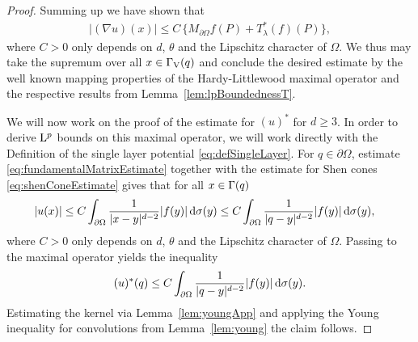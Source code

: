 \begin{proof}
  Summing up we have shown that
  \begin{align*}
    |(\nabla u)(x)| \leq C\, \Big\{ M_{\partial\Omega} f(P) + T_\lambda^*(f)(P) \Big\},
  \end{align*}
  where $C > 0$ only depends on $d$, $\theta$ and the Lipschitz character of $\Omega$.
  We thus may take the supremum over all $x \in \Gamma_\mathrm{V}(q)$ and conclude the desired estimate by the well known mapping properties of the Hardy-Littlewood maximal operator and the respective results from Lemma~\ref{lem:lpBoundednessT}.

  We will now work on the proof of the estimate for $(u)^*$ for $d \geq 3$.
  In order to derive $\mathrm{L}^p$ bounds on this maximal operator, we will work directly with the Definition of the single layer potential \eqref{eq:defSingleLayer}.
  For $q \in \partial\Omega$, estimate \eqref{eq:fundamentalMatrixEstimate} together with the estimate for Shen cones \eqref{eq:shenConeEstimate} gives that for all $x \in \Gamma(q)$
  \begin{align*}
    |u(x)| 
    &\leq C \int_{\partial\Omega} \frac{1}{|x - y|^{d - 2}} |f(y)| \, {\operatorname{d}\!{\sigma}}(y) 
    \leq  C \int_{\partial\Omega} \frac{1}{|q - y|^{d - 2}} |f(y)| \, {\operatorname{d}\!{\sigma}}(y),
  \end{align*}
  where $C > 0$ only depends on $d$, $\theta$ and the Lipschitz character of $\Omega$.
  Passing to the maximal operator yields the inequality
  \begin{align*}
    (u)^*(q) \leq  C \int_{\partial\Omega} \frac{1}{|q - y|^{d - 2}} |f(y)| \, {\operatorname{d}\!{\sigma}}(y).
  \end{align*}
  Estimating the kernel via Lemma~\ref{lem:youngApp} and applying the Young inequality for convolutions from Lemma~\ref{lem:young} the claim follows.
\end{proof}

